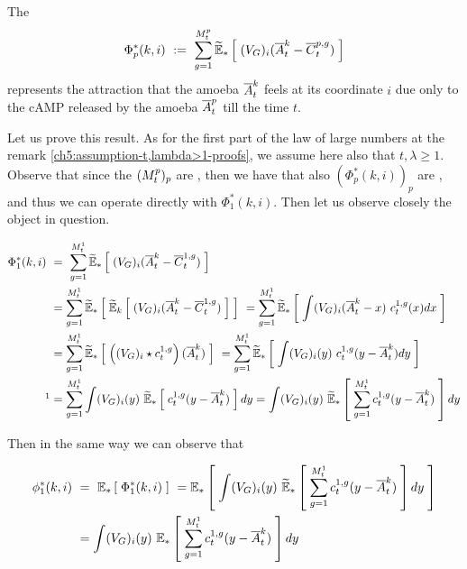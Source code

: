 \begin{remark}
	The \rv 
	\begin{equation}
		\Phi_p^\ast (k,i)\
		:=\
		\sum _{g = 1}^{M_t^p} 
		\widetilde{\mathbb{E}}_{\ast} \left[ \; 
			(V_{G})_i(\overline{A}_t^k - \overline{C}_t^{p,g})
		 \; \right]
	\end{equation}
	represents the attraction that the amoeba $\overline{A}_t^k$ feels at its coordinate $i$ due only to the cAMP released by the amoeba $\overline{A}_t^p$ till the time $t$.
\end{remark}

Let us prove this result.
As for the first part of the law of large numbers at the remark \ref{ch5:assumption-t,lambda>1-proofs}, we assume here also that $t,\lambda\geq1$.
Observe that since the $(M_t^p)_p$ are \iid, then we have that also $(\Phi_p^\ast (k,i))_p$ are \iid, and thus we can operate directly with $\Phi_1^\ast (k,i)$.
Then let us observe closely the object in question.
	
	\begin{align*}
		\Phi_1^\ast (k,i)\
		&=\
		\sum _{g = 1}^{\hmactive_t^1} 
		\ETFoot
		{\ast}
		{
			(\genAttraction)_i(\mfamba_t^k - \mfcamp_t^{1,g})
		}
		\\		
		&=
		\sum _{g = 1}^{\hmactive_t^1}
		\ETFoot
		{\ast}
		{
			\ETFoot
			{k}
			{
				(\genAttraction)_i(\mfamba_t^k - \mfcamp_t^{1,g})
			}
		}\
		=
		\sum _{g = 1}^{\hmactive_t^1}
		\ETFoot
		{\ast}{
			\int 
			(\genAttraction)_i(\mfamba_t^k - x)\
			\cdens_t^{1,g}(x)
			dx
		}
		\\
		&=
		\sum _{g = 1}^{\hmactive_t^1}
		\ETFoot
		{\ast}{
			\left(
			(\genAttraction)_i 
			\star 
			\cdens_t^{1,g}
			\right)
			(\mfamba_t^k)
		}\
		= 
		\sum _{g = 1}^{\hmactive_t^1}
		\ETFoot
		{\ast}{
			\int
			(\genAttraction)_i (y)\
			\cdens_t^{1,g}
			(y - \mfamba_t^k)
			dy
		}
		\\
		\footnotemark[1] & =
		\sum _{g = 1}^{\hmactive_t^1}
		\int
		(\genAttraction)_i (y)\
		\ETFoot
		{\ast}{
			\cdens_t^{1,g}
			(y - \mfamba_t^k)
		}
		dy
		=
		\int
		(\genAttraction)_i (y)\
		\ETFoot
		{\ast}{
			\sum _{g = 1}^{\hmactive_t^1}
			\cdens_t^{1,g}
			(y - \mfamba_t^k)
		}
		dy
	\end{align*}
	
	Then in the same way we can observe that
	
	\begin{align*}
		\phi_1^\ast (k,i)\
		&=\
		\mathbb{E}_{\ast} \left[ \; 
			\Phi_1^\ast (k,i)
		 \; \right]\
		=
		\mathbb{E}_{\ast} \left[ \; 
			\int
			(V_{G})_i (y)\
			\widetilde{\mathbb{E}}_{\ast} \left[ \; 
				\sum _{g = 1}^{M_t^1}
				c_t^{1,g}
				(y - \overline{A}_t^k)
			 \; \right]
			dy
		 \; \right]
		\\
		&=
		\int
		(V_{G})_i (y)\
		\mathbb{E}_{\ast} \left[ \; 
			\sum _{g = 1}^{M_t^1}
			c_t^{1,g}
			(y - \overline{A}_t^k)
		 \; \right]
		dy
	\end{align*}
	
